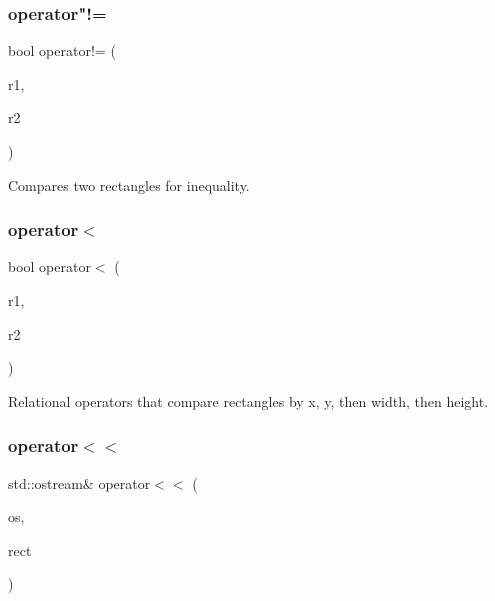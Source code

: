 \subsubsection{\texorpdfstring{operator"!=}{operator!=}}
{\footnotesize\ttfamily bool operator!= (\begin{DoxyParamCaption}\item[{const \mbox{\hyperlink{structsgl_1_1GRectangle}{G\+Rectangle}} \&}]{r1,  }\item[{const \mbox{\hyperlink{structsgl_1_1GRectangle}{G\+Rectangle}} \&}]{r2 }\end{DoxyParamCaption})\hspace{0.3cm}{\ttfamily [friend]}}



Compares two rectangles for inequality. 

\mbox{\label{structsgl_1_1GRectangle_a4a0fc8587bc8eccebfdd62416942c5d8}} 
\subsubsection{\texorpdfstring{operator$<$}{operator<}}
{\footnotesize\ttfamily bool operator$<$ (\begin{DoxyParamCaption}\item[{const \mbox{\hyperlink{structsgl_1_1GRectangle}{G\+Rectangle}} \&}]{r1,  }\item[{const \mbox{\hyperlink{structsgl_1_1GRectangle}{G\+Rectangle}} \&}]{r2 }\end{DoxyParamCaption})\hspace{0.3cm}{\ttfamily [friend]}}



Relational operators that compare rectangles by x, y, then width, then height. 

\mbox{\label{structsgl_1_1GRectangle_a9986499c29c915ee31d512f44a8f8a0d}} 
\subsubsection{\texorpdfstring{operator$<$$<$}{operator<<}}
{\footnotesize\ttfamily std\+::ostream\& operator$<$$<$ (\begin{DoxyParamCaption}\item[{std\+::ostream \&}]{os,  }\item[{const \mbox{\hyperlink{structsgl_1_1GRectangle}{G\+Rectangle}} \&}]{rect }\end{DoxyParamCaption})\hspace{0.3cm}{\ttfamily [friend]}}



